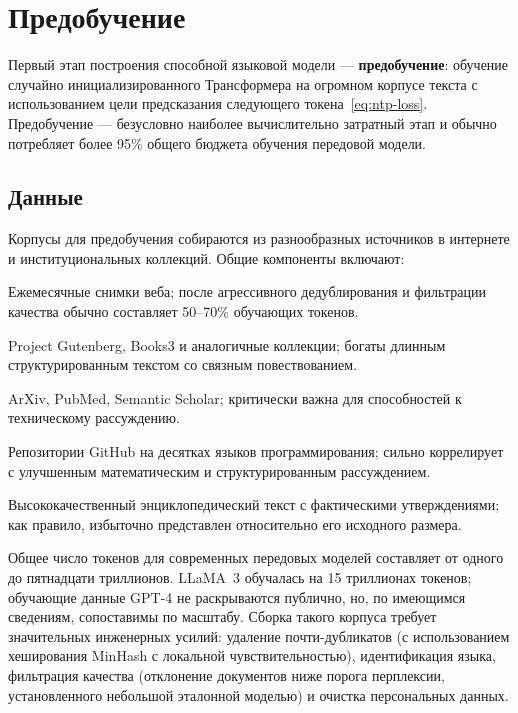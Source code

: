 \section{Предобучение}
\label{sec:pretraining}

Первый этап построения способной языковой модели --- \textbf{предобучение}: обучение случайно инициализированного Трансформера на огромном корпусе текста с использованием цели предсказания следующего токена~\eqref{eq:ntp-loss}. Предобучение --- безусловно наиболее вычислительно затратный этап и обычно потребляет более 95\% общего бюджета обучения передовой модели.

\subsection{Данные}

Корпусы для предобучения собираются из разнообразных источников в интернете и институциональных коллекций. Общие компоненты включают:

\begin{description}[leftmargin=!, labelwidth=3.5cm, align=parleft]
  \item[Common Crawl] Ежемесячные снимки веба; после агрессивного дедублирования и фильтрации качества обычно составляет 50--70\% обучающих токенов.
  \item[Книги] Project Gutenberg, Books3 и аналогичные коллекции; богаты длинным структурированным текстом со связным повествованием.
  \item[Научная литература] ArXiv, PubMed, Semantic Scholar; критически важна для способностей к техническому рассуждению.
  \item[Код] Репозитории GitHub на десятках языков программирования; сильно коррелирует с улучшенным математическим и структурированным рассуждением.
  \item[Википедия и Викиданные] Высококачественный энциклопедический текст с фактическими утверждениями; как правило, избыточно представлен относительно его исходного размера.
\end{description}

Общее число токенов для современных передовых моделей составляет от одного до пятнадцати триллионов. LLaMA~3 обучалась на 15 триллионах токенов; обучающие данные GPT-4 не раскрываются публично, но, по имеющимся сведениям, сопоставимы по масштабу. Сборка такого корпуса требует значительных инженерных усилий: удаление почти-дубликатов (с использованием хеширования MinHash с локальной чувствительностью), идентификация языка, фильтрация качества (отклонение документов ниже порога перплексии, установленного небольшой эталонной моделью) и очистка персональных данных.


